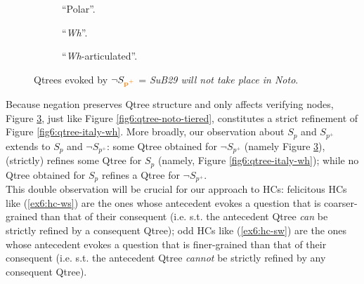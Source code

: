 \begin{figure}[H]
	\centering
	\begin{subfigure}[b]{.2\linewidth}
		\centering
		\caption[]{``Polar''.}\label{fig6:qtree-not-noto-polar}
	\end{subfigure}\hfill
	\begin{subfigure}[b]{.37\linewidth}
		\centering
		\caption[]{``\textit{Wh}''.}\label{fig6:qtree-not-noto-wh}
	\end{subfigure}\hfill
	\begin{subfigure}[b]{.37\linewidth}
		\centering
		\caption[]{``\textit{Wh}-articulated''.}\label{fig6:qtree-not-noto-tiered}
	\end{subfigure}
	\caption[]{Qtrees evoked by $\neg S_{\textbf{\textcolor{orange}{p$^+$}}}$ = \textit{SuB29 will not take place in Noto}.}\label{fig6:qtrees-not-noto}
\end{figure}

Because negation preserves Qtree structure and only affects verifying nodes, Figure \ref{fig6:qtree-not-noto-tiered}, just like Figure \ref{fig6:qtree-noto-tiered}, constitutes a strict refinement of Figure \ref{fig6:qtree-italy-wh}. More broadly, our observation about $S_p$ and $S_{p^+}$ extends to $S_p$ and $\neg S_{p^+}$: some Qtree obtained for $\neg S_{p^+}$ (namely Figure \ref{fig6:qtree-not-noto-tiered}), (strictly) refines some Qtree for $S_p$ (namely, Figure \ref{fig6:qtree-italy-wh}); while no Qtree obtained for $S_p$ refines a Qtree for $\neg S_{p^+}$.\\

This double observation will be crucial for our approach to HCs: felicitous HCs like (\ref{ex6:hc-ws}) are the ones whose antecedent evokes a question that is coarser-grained than that of their consequent (i.e. s.t. the antecedent Qtree \textit{can} be strictly refined by a consequent Qtree); odd HCs like (\ref{ex6:hc-sw}) are the ones whose antecedent evokes a question that is finer-grained than that of their consequent (i.e. s.t. the antecedent Qtree \textit{cannot} be strictly refined by any consequent Qtree).

